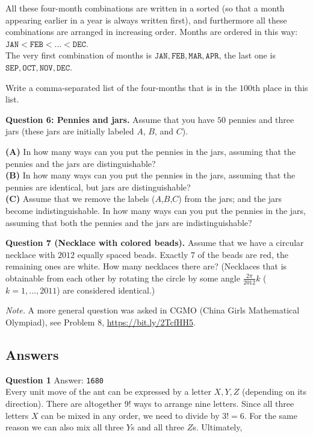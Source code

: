 \documentclass[jou]{apa6}
\begin{document}
All these four-month combinations are written in a sorted (so that a month appearing earlier in a year is always
written first), and furthermore \textendash{} all these combinations are arranged in increasing order. 
Months are ordered in this way: $\mathtt{JAN} < \mathtt{FEB} < \ldots < \mathtt{DEC}$.\\
The very first combination of months is $\mathtt{JAN},\mathtt{FEB},\mathtt{MAR},\mathtt{APR}$, 
the last one is $\mathtt{SEP},\mathtt{OCT},\mathtt{NOV},\mathtt{DEC}$. 

Write a comma-separated list of the four-months that is in the $100$th place in this list. 


\vspace{6pt}
{\bf Question 6: Pennies and jars.} 
Assume that you have $50$ pennies and three jars (these jars are initially labeled $A$, $B$, and $C$). 

{\bf (A)} In how many ways can you put the pennies in the jars, assuming that the pennies and the jars are distinguishable?\\
{\bf (B)} In how many ways can you put the pennies in the jars, assuming that the pennies are identical, but jars are distinguishable?\\
{\bf (C)} Assume that we remove the labels ($A$,$B$,$C$) from the jars; and the jars become indistinguishable. 
In how many ways can you put the pennies in the jars, assuming that both the pennies and the jars are indistinguishable?

\vspace{6pt}
{\bf Question 7 (Necklace with colored beads).} Assume that we have a circular necklace with 
$2012$ equally spaced beads. Exactly $7$ of the beads are red, the remaining ones are white. 
How many necklaces there are? (Necklaces that is obtainable from each other by rotating the
circle by some angle $\frac{2\pi}{2012}k$ ($k = 1,\ldots,2011$) are considered identical.)

{\em Note.} A more general question was asked in CGMO (China Girls Mathematical Olympiad), 
see Problem 8, \url{https://bit.ly/2TcfHH5}. 


\newpage
\subsection{Answers}

\vspace{6pt}
{\bf Question 1} Answer: {\tt 1680}\\
Every unit move of the ant can be expressed by a letter $X,Y,Z$ (depending 
on its direction). There are altogether $9!$ ways to arrange 
nine letters. Since all three letters $X$ can be mixed in any order, we need
to divide by $3! = 6$. For the same reason we can also mix all three $Y$s and 
all three $Z$s. Ultimately, 
\end{document}
